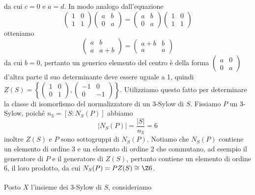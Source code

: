 \documentclass[11pt]{scrartcl}
\begin{document}
da cui $c = 0$ e $a = d$. In modo analogo dall'equazione
\[
    \begin{pmatrix}
        1 & 0\\
        1 & 1
    \end{pmatrix}
    \begin{pmatrix}
        a & b\\
        0 & a
    \end{pmatrix} = 
    \begin{pmatrix}
        a & b\\
        0 & a
    \end{pmatrix}
    \begin{pmatrix}
        1 & 0\\
        1 & 1
    \end{pmatrix}
\]
otteniamo 
\[
    \begin{pmatrix}
        a & b\\
        a & a + b
    \end{pmatrix} = 
    \begin{pmatrix}
        a + b & b\\
        a & a
    \end{pmatrix}
\]
da cui $b = 0$, pertanto un generico elemento del centro è della forma
$
    \begin{pmatrix}
        a & 0\\
        0 & a
    \end{pmatrix}
$
d'altra parte il suo determinante deve essere uguale a 1, quindi $Z(S) = 
\left\{\begin{pmatrix}
    1 & 0\\
    0 & 1
\end{pmatrix}, \begin{pmatrix}
    -1 & 0\\
    0 & -1
\end{pmatrix}\right\}$. Utilizziamo questo fatto per determinare la classe
di isomorfismo del normalizzatore di un 3-Sylow di $S$. \newline 
Fissiamo $P$ un 3-Sylow, poiché $n_3 = [S: N_S(P)]$ abbiamo 
\[
    |N_S(P)| = \frac{|S|}{n_3} = 6
\]
inoltre $Z(S)$ e $P$ sono sottogruppi di $N_S(P)$. Notiamo che $N_S(P)$
contiene un elemento di ordine 3 e un elemento di ordine 2 che commutano, 
ad esempio il generatore di $P$ e il generatore di $Z(S)$,
pertanto contiene un elemento di ordine 6, il loro prodotto, da cui 
$N_S(P) = PZ(S) \cong \Z6$.
\\\\
Posto $X$ l'insieme dei 3-Sylow di $S$, consideriamo
\end{document}
